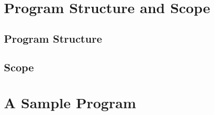 \documentclass{article}
\begin{document}
\section{Program Structure and Scope}

\subsection{Program Structure}

\subsection{Scope}

\section{A Sample Program}
\end{document}
